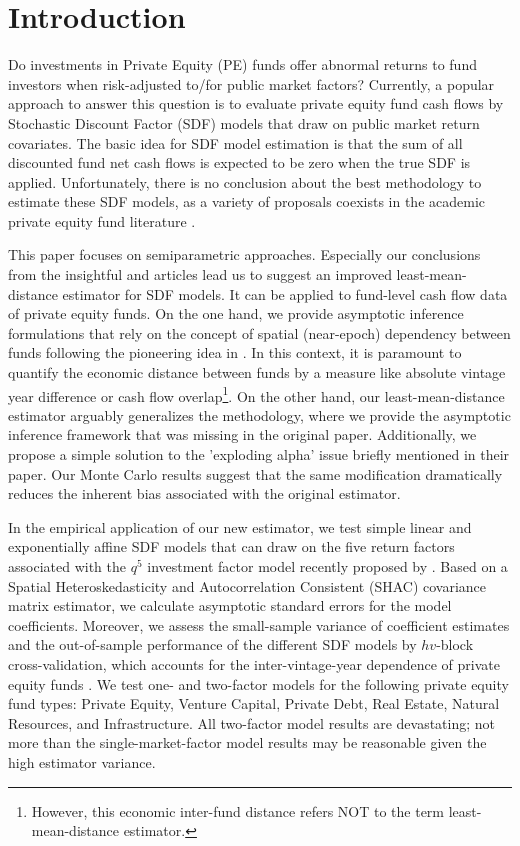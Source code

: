 \documentclass[12pt]{article}
\begin{document}
\section{Introduction}

Do investments in Private Equity (PE) funds offer abnormal returns to fund investors when risk-adjusted to/for public market factors?
Currently, a popular approach to answer this question is to evaluate private equity fund cash flows by Stochastic Discount Factor (SDF) models that draw on public market return covariates.
The basic idea for SDF model estimation is that the sum of all discounted fund net cash flows is expected to be zero when the true SDF is applied.
Unfortunately, there is no conclusion about the best methodology to estimate these SDF models, as a variety of proposals coexists in the academic private equity fund literature \citep{DLP12,B14,KN16,ACGP18,GSW19}.

This paper focuses on semiparametric approaches.
Especially our conclusions from the insightful \cite{DLP12} and \cite{KN16} articles lead us to suggest an improved least-mean-distance estimator for SDF models.
It can be applied to fund-level cash flow data of private equity funds.
On the one hand, we provide asymptotic inference formulations that rely on the concept of spatial (near-epoch) dependency between funds following the pioneering idea in \cite{KN16}.
In this context, it is paramount to quantify the economic distance between funds by a measure like absolute vintage year difference or cash flow overlap\footnote{However, this economic inter-fund distance refers NOT to the term least-mean-distance estimator.}.
On the other hand, our least-mean-distance estimator arguably generalizes the \cite{DLP12} methodology, where we provide the asymptotic inference framework that was missing in the original paper.
Additionally, we propose a simple solution to the 'exploding alpha' issue briefly mentioned in their paper.
Our Monte Carlo results suggest that the same modification dramatically reduces the inherent bias associated with the original \cite{DLP12} estimator.

In the empirical application of our new estimator, we test simple linear and exponentially affine SDF models that can draw on the five return factors associated with the $q^5$ investment factor model recently proposed by \cite{HXZ20}.
Based on a Spatial Heteroskedasticity and Autocorrelation Consistent (SHAC) covariance matrix estimator, we calculate asymptotic standard errors for the model coefficients.
Moreover, we assess the small-sample variance of coefficient estimates and the out-of-sample performance of the different SDF models by $hv$-block cross-validation, which accounts for the inter-vintage-year dependence of private equity funds \citep{R00}.
We test one- and two-factor models for the following private equity fund types: Private Equity, Venture Capital, Private Debt, Real Estate, Natural Resources, and Infrastructure.
All two-factor model results are devastating; not more than the single-market-factor model results may be reasonable given the high estimator variance.
\end{document}
